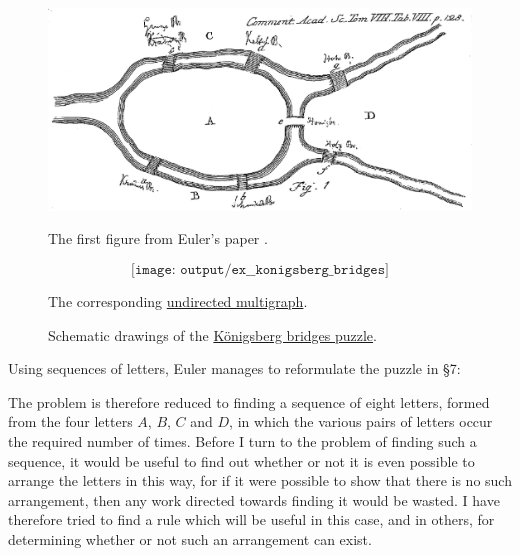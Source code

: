 \begin{example}
  \begin{figure}[ht!]
    \begin{subcaptionblock}{0.55\textwidth}
      \centering
      \includegraphics[width=\textwidth]{images/ex__konigsberg_bridges__schematic__drawing}
      \caption{The first figure from Euler's paper \cite{Euler1741Bridges}.}
      \label{fig:ex:konigsberg_bridges/schematic/drawing}
    \end{subcaptionblock}
    \hfill
    \begin{subcaptionblock}{0.4\textwidth}
      \centering
      \begin{equation}\label{eq:fig:ex:konigsberg_bridges/schematic/graph}
        \texttt{[image: output/ex\_\_konigsberg\_bridges]}
      \end{equation}
      \caption{The corresponding \hyperref[def:hypergraph/multigraph]{undirected multigraph}.}
      \label{fig:ex:konigsberg_bridges/schematic/graph}
    \end{subcaptionblock}

    \caption{Schematic drawings of the \hyperref[ex:konigsberg_bridges]{K\"onigsberg bridges puzzle}.}\label{fig:ex:konigsberg_bridges/schematic}
  \end{figure}

  Using sequences of letters, Euler manages to reformulate the puzzle in \S 7:
  \begin{displayquote}
    The problem is therefore reduced to finding a sequence of eight letters, formed from the four letters \( A \), \( B \), \( C \) and \( D \), in which the various pairs of letters occur the required number of times. Before I turn to the problem of finding such a sequence, it would be useful to find out whether or not it is even possible to arrange the letters in this way, for if it were possible to show that there is no such arrangement, then any work directed towards finding it would be wasted. I have therefore tried to find a rule which will be useful in this case, and in others, for determining whether or not such an arrangement can exist.
  \end{displayquote}


\end{example}
